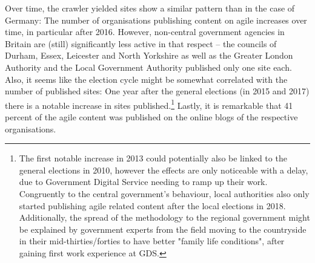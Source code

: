 Over time, the crawler yielded sites show a similar pattern than in the case of Germany: The number of organisations publishing content on agile increases over time, in particular after 2016. However, non-central government agencies in Britain are (still) significantly less active in that respect – the councils of Durham, Essex, Leicester and North Yorkshire as well as the Greater London Authority and the Local Government Authority published only one site each. Also, it seems like the election cycle might be somewhat correlated with the number of published sites: One year after the general elections (in 2015 and 2017) there is a notable increase in sites published.\footnote{The first notable increase in 2013 could potentially also be linked to the general elections in 2010, however the effects are only noticeable with a delay, due to Government Digital Service needing to ramp up their work. Congruently to the central government's behaviour, local authorities also only started publishing agile related content after the local elections in 2018. Additionally, the spread of the methodology to the regional government might be explained by government experts from the field moving to the countryside in their mid-thirties/forties to have better "family life conditions", after gaining first work experience at GDS.} Lastly, it is remarkable that 41 percent of the agile content was published on the online blogs of the respective organisations.
